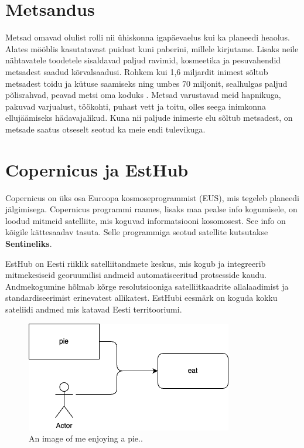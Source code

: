 \section{Metsandus}
Metsad omavad olulist rolli nii ühiskonna igapäevaelus kui ka planeedi heaolus.
Alates mööblis kasutatavast puidust kuni paberini, millele kirjutame. Lisaks neile
nähtavatele toodetele sisaldavad paljud ravimid, kosmeetika ja pesuvahendid
metsadest saadud kõrvalsaadusi. Rohkem kui 1,6 miljardit inimest sõltub
metsadest toidu ja kütuse saamiseks ning umbes 70 miljonit, sealhulgas paljud
põlisrahvad, peavad metsi oma koduks \cite{karsentyUnderlyingCausesRapid2003}. 
Metsad varustavad meid hapnikuga, pakuvad
varjualust, töökohti, puhast vett ja toitu, olles seega inimkonna ellujäämiseks
hädavajalikud. Kuna nii paljude inimeste elu sõltub metsadest, on metsade saatus
otseselt seotud ka meie endi tulevikuga. \cite{WWFImportanceForests} 

\section{Copernicus ja EstHub}
Copernicus on üks osa Euroopa kosmoseprogrammist (EUS), mis tegeleb planeedi jälgimisega. Copernicus programmi raames, lisaks maa pealse info kogumisele, on loodud mitmeid satelliite, mis koguvad informatsiooni kosomosest. See info on kõigile kättesaadav tasuta. Selle programmiga seotud satellite kutsutakse \textbf{Sentineliks}. \cite{CopernicusCopernicus}

EstHub on Eesti riiklik satelliitandmete keskus, mis kogub ja integreerib
mitmekesiseid georuumilisi andmeid automatiseeritud protsesside kaudu.
Andmekogumine hõlmab kõrge resolutsiooniga satelliitkaadrite allalaadimist ja
standardiseerimist erinevatest allikatest. EstHubi eesmärk on koguda kokku sateliidi andmed mis katavad Eesti territooriumi. \cite{maa-ametNationalSatelliteData}

\begin{figure}[hb] %
    \centering
    \includegraphics[width=.5\textwidth]{figures/test.drawio.png} %
    \caption{An image of me enjoying a pie..} %
    \label{fig:testpie} %
\end{figure}


